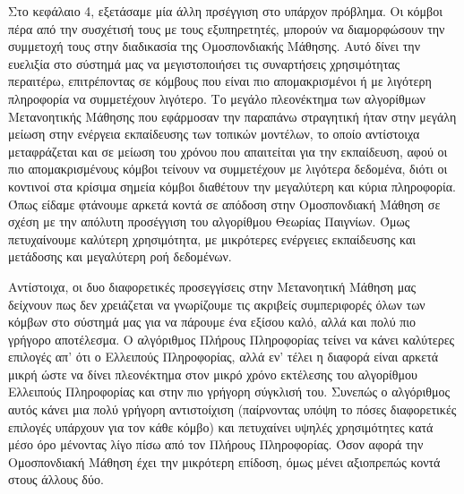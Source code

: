 Στο κεφάλαιο 4, εξετάσαμε μία άλλη πρσέγγιση στο υπάρχον πρόβλημα. Οι κόμβοι πέρα από την συσχέτισή τους με τους εξυπηρετητές, μπορούν να διαμορφώσουν την συμμετοχή τους στην διαδικασία της Ομοσπονδιακής Μάθησης. Αυτό δίνει την ευελιξία στο σύστημά μας να μεγιστοποιήσει τις συναρτήσεις χρησιμότητας περαιτέρω, επιτρέποντας σε κόμβους που είναι πιο απομακρισμένοι ή με λιγότερη πληροφορία να συμμετέχουν λιγότερο. Το μεγάλο πλεονέκτημα των αλγορίθμων Μετανοητικής Μάθησης που εφάρμοσαν την παραπάνω στραγητική ήταν στην μεγάλη μείωση στην ενέργεια εκπαίδευσης των τοπικών μοντέλων, το οποίο αντίστοιχα μεταφράζεται και σε μείωση του χρόνου που απαιτείται για την εκπαίδευση, αφού οι πιο απομακρισμένους κόμβοι τείνουν να συμμετέχουν με λιγότερα δεδομένα, διότι οι κοντινοί στα κρίσιμα σημεία κόμβοι διαθέτουν την μεγαλύτερη και κύρια πληροφορία. Όπως είδαμε φτάνουμε αρκετά κοντά σε απόδοση στην Ομοσπονδιακή Μάθηση σε σχέση με την απόλυτη προσέγγιση του αλγορίθμου Θεωρίας Παιγνίων. Όμως πετυχαίνουμε καλύτερη χρησιμότητα, με μικρότερες ενέργειες εκπαίδευσης και μετάδοσης και μεγαλύτερη ροή δεδομένων.

Αντίστοιχα, οι δυο διαφορετικές προσεγγίσεις στην Μετανοητική Μάθηση μας δείχνουν πως δεν χρειάζεται να γνωρίζουμε τις ακριβείς συμπεριφορές όλων των κόμβων στο σύστημά μας για να πάρουμε ένα εξίσου καλό, αλλά και πολύ πιο γρήγορο αποτέλεσμα. Ο αλγόριθμος Πλήρους Πληροφορίας τείνει να κάνει καλύτερες επιλογές απ' ότι ο Ελλειπούς Πληροφορίας, αλλά εν' τέλει η διαφορά είναι αρκετά μικρή ώστε να δίνει πλεονέκτημα στον μικρό χρόνο εκτέλεσης του αλγορίθμου Ελλειπούς Πληροφορίας και στην πιο γρήγορη σύγκλισή του. Συνεπώς ο αλγόριθμος αυτός κάνει μια πολύ γρήγορη αντιστοίχιση (παίρνοντας υπόψη το πόσες διαφορετικές επιλογές υπάρχουν για τον κάθε κόμβο) και πετυχαίνει υψηλές χρησιμότητες κατά μέσο όρο μένοντας λίγο πίσω από τον Πλήρους Πληροφορίας. Όσον αφορά την Ομοσπονδιακή Μάθηση έχει την μικρότερη επίδοση, όμως μένει αξιοπρεπώς κοντά στους άλλους δύο.

